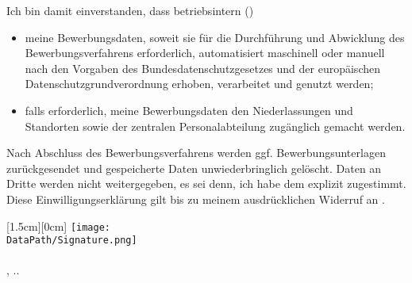 \documentclass[a4paper,fontsize=12]{scrartcl}
\newcommand{\PrettyDate}{\number\day{}.\number\month{}.\number\year}
\newcommand{\MySignature}{%
	\parbox{\linewidth}{%
	\bigskip\hspace*{0.6cm}\raisebox{-0.4cm}[1.5cm][0cm]{%
		\texttt{[image: \\DataPath/Signature.png]}\\
	}\\
	\MyCity{}, \PrettyDate \\
	\MyNameFirst{} \MyNameLast
}}
\begin{document}
Ich bin damit einverstanden, dass betriebsintern (\RecpCompany)
\begin{itemize}\itemsep0em
\item meine Bewerbungsdaten, soweit sie für die Durchführung und Abwicklung des Bewerbungsverfahrens erforderlich, automatisiert maschinell oder manuell nach den Vorgaben des Bundesdatenschutzgesetzes und der europäischen Datenschutzgrundverordnung erhoben, verarbeitet und genutzt werden;
\item falls erforderlich, meine Bewerbungsdaten den Niederlassungen und Standorten sowie der zentralen Personalabteilung zugänglich gemacht werden.
\end{itemize}
Nach Abschluss des Bewerbungsverfahrens werden ggf. Bewerbungsunterlagen zurückgesendet und gespeicherte Daten unwiederbringlich gelöscht. Daten an Dritte werden nicht weitergegeben, es sei denn, ich habe dem explizit zugestimmt. Diese Einwilligungserklärung gilt bis zu meinem ausdrücklichen Widerruf an \RecpEmail.

\vfill
\MySignature
\vfill\vfill\vfill
\end{document}
